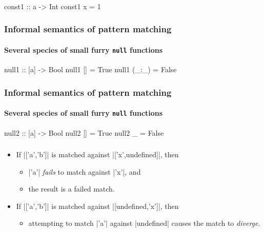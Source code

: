 \documentclass{beamer}
\begin{document}
\begin{frame}[fragile]
  \frametitle{}

  \begin{code}
const1 :: a -> Int
const1 x = 1
  \end{code}
\end{frame}


\begin{frame}[fragile]
  \frametitle{Informal semantics of pattern matching}
  \framesubtitle{Several species of small furry \texttt{null} functions}

  \begin{code}
null1 :: [a] -> Bool
null1 []    = True
null1 (_:_) = False
  \end{code}
\end{frame}

\begin{frame}[fragile]
  \frametitle{Informal semantics of pattern matching}
  \framesubtitle{Several species of small furry \texttt{null} functions}

  \begin{code}
null2 :: [a] -> Bool
null2 []    = True
null2 _     = False
  \end{code}
\end{frame}


\begin{frame}[fragile]
  \frametitle{}

  \begin{examples}
    \begin{itemize}
    \item<1->
      If |['a','b']| is matched against |['x',undefined]|, then
      \begin{itemize}
      \item<2->
        |'a'| \emph{fails} to match against |'x'|, and
      \item<2->
        the result is a failed match.
      \end{itemize}
    \item<1->
      If |['a','b']| is matched against |[undefined,'x']|, then
      \begin{itemize}
      \item<2->
        attempting to match |'a'| against |undefined| causes the match
        to \emph{diverge}.
      \end{itemize}
    \end{itemize}
  \end{examples}
\end{frame}
\end{document}

